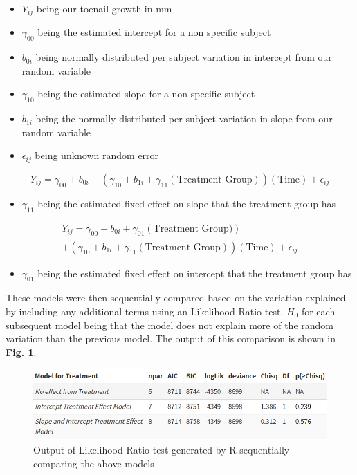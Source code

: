\documentclass{article}
\begin{document}
\begin{itemize}
    \item $Y_{ij}$ being our toenail growth in mm
    \item $\gamma_{00}$ being the estimated intercept for a non specific subject
    \item $b_{0i}$ being normally distributed per subject variation in intercept from our random variable
    \item $\gamma_{10}$ being the estimated slope for a non specific subject
    \item $b_{1i}$ being the normally distributed per subject variation in slope from our random variable
    \item $\epsilon_{ij}$ being unknown random error
\end{itemize}
\begin{equation}
    Y_{ij} = \gamma_{00}+b_{0i}+(\gamma_{10}+b_{1i}+\gamma_{11}(\textrm{Treatment Group}))(\textrm{Time}) + \epsilon_{ij}
\end{equation}
\begin{itemize}
    \item $\gamma_{11}$ being the estimated fixed effect on slope that the treatment group has
\end{itemize}
\begin{multline}
    Y_{ij} = \gamma_{00}+b_{0i}+\gamma_{01}(\textrm{Treatment Group)})\\+(\gamma_{10}+b_{1i}+\gamma_{11}(\textrm{Treatment Group}))(\textrm{Time}) + \epsilon_{ij}
\end{multline}
\begin{itemize}
    \item $\gamma_{01}$ being the estimated fixed effect on intercept that the treatment group has
\end{itemize}

These models were then sequentially compared based on the variation explained by including any additional terms using an Likelihood Ratio test. $H_0$ for each subsequent model being that the model does not explain more of the random variation than the previous model. The output of this comparison is shown in \textbf{Fig. 1}.

\begin{figure}[H]
\includegraphics[width = \textwidth]{model_anova.png}
\centering
\caption{Output of Likelihood Ratio test generated by R sequentially comparing the above models}
\end{figure}
\end{document}
